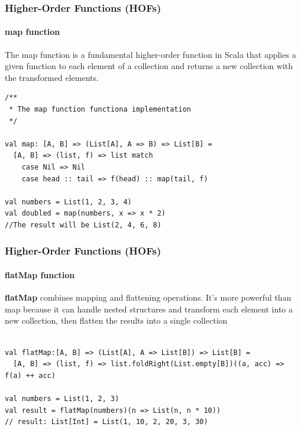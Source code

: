 \documentclass{beamer}
\begin{document}
\begin{frame}[fragile]
\frametitle{Higher-Order Functions (HOFs)}
\framesubtitle{map function}

The map function is a fundamental higher-order function in Scala that applies a given function to each element of a collection and returns a new collection with the transformed elements.

\begin{lstlisting}[style=scalaStyle]
/**
 * The map function functiona implementation
 */

val map: [A, B] => (List[A], A => B) => List[B] =
  [A, B] => (list, f) => list match
    case Nil => Nil
    case head :: tail => f(head) :: map(tail, f)

val numbers = List(1, 2, 3, 4)
val doubled = map(numbers, x => x * 2)  
//The result will be List(2, 4, 6, 8)

\end{lstlisting}

\end{frame}

\begin{frame}[fragile]
\frametitle{Higher-Order Functions (HOFs)}
\framesubtitle{flatMap function}

\textbf{flatMap} combines mapping and flattening operations. It's more powerful than map because it can handle nested structures and transform each element into a new collection, then flatten the results into a single collection

\begin{lstlisting}[style=scalaStyle]

val flatMap:[A, B] => (List[A], A => List[B]) => List[B] = 
  [A, B] => (list, f) => list.foldRight(List.empty[B])((a, acc) => f(a) ++ acc)

val numbers = List(1, 2, 3)
val result = flatMap(numbers)(n => List(n, n * 10))
// result: List[Int] = List(1, 10, 2, 20, 3, 30)

\end{lstlisting}

\end{frame}
\end{document}
